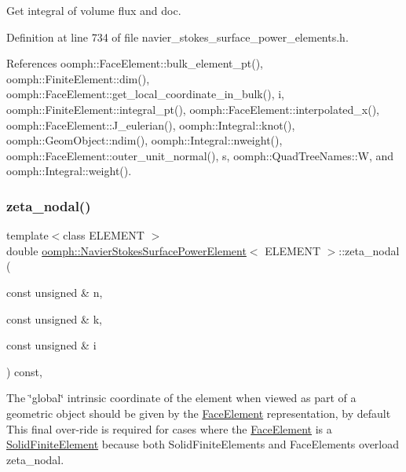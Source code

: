 Get integral of volume flux and doc. 



Definition at line 734 of file navier\+\_\+stokes\+\_\+surface\+\_\+power\+\_\+elements.\+h.



References oomph\+::\+Face\+Element\+::bulk\+\_\+element\+\_\+pt(), oomph\+::\+Finite\+Element\+::dim(), oomph\+::\+Face\+Element\+::get\+\_\+local\+\_\+coordinate\+\_\+in\+\_\+bulk(), i, oomph\+::\+Finite\+Element\+::integral\+\_\+pt(), oomph\+::\+Face\+Element\+::interpolated\+\_\+x(), oomph\+::\+Face\+Element\+::\+J\+\_\+eulerian(), oomph\+::\+Integral\+::knot(), oomph\+::\+Geom\+Object\+::ndim(), oomph\+::\+Integral\+::nweight(), oomph\+::\+Face\+Element\+::outer\+\_\+unit\+\_\+normal(), s, oomph\+::\+Quad\+Tree\+Names\+::W, and oomph\+::\+Integral\+::weight().

\mbox{\label{classoomph_1_1NavierStokesSurfacePowerElement_add4a49170201b878ed97449dd3d55a42}} 
\subsubsection{\texorpdfstring{zeta\+\_\+nodal()}{zeta\_nodal()}}
{\footnotesize\ttfamily template$<$class E\+L\+E\+M\+E\+NT $>$ \\
double \hyperlink{classoomph_1_1NavierStokesSurfacePowerElement}{oomph\+::\+Navier\+Stokes\+Surface\+Power\+Element}$<$ E\+L\+E\+M\+E\+NT $>$\+::zeta\+\_\+nodal (\begin{DoxyParamCaption}\item[{const unsigned \&}]{n,  }\item[{const unsigned \&}]{k,  }\item[{const unsigned \&}]{i }\end{DoxyParamCaption}) const\hspace{0.3cm}{\ttfamily [inline]}, {\ttfamily [virtual]}}



The \char`\"{}global\char`\"{} intrinsic coordinate of the element when viewed as part of a geometric object should be given by the \hyperlink{classoomph_1_1FaceElement}{Face\+Element} representation, by default This final over-\/ride is required for cases where the \hyperlink{classoomph_1_1FaceElement}{Face\+Element} is a \hyperlink{classoomph_1_1SolidFiniteElement}{Solid\+Finite\+Element} because both Solid\+Finite\+Elements and Face\+Elements overload zeta\+\_\+nodal. 




